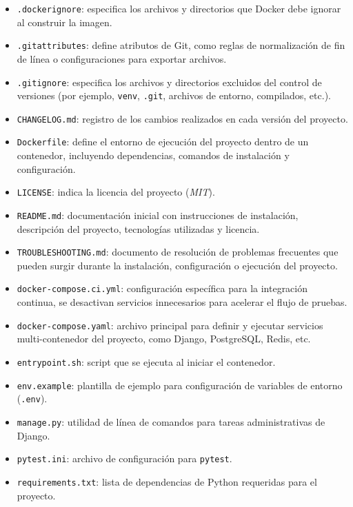 \begin{itemize}
    \item \texttt{.dockerignore}: especifica los archivos y directorios que Docker debe ignorar al construir la imagen.
    \item \texttt{.gitattributes}: define atributos de Git, como reglas de normalización de fin de línea o configuraciones para exportar archivos.
    \item \texttt{.gitignore}: especifica los archivos y directorios excluidos del control de versiones (por ejemplo, \texttt{venv}, \texttt{.git}, archivos de entorno, compilados, etc.).
    \item \texttt{CHANGELOG.md}: registro de los cambios realizados en cada versión del proyecto.
    \item \texttt{Dockerfile}: define el entorno de ejecución del proyecto dentro de un contenedor, incluyendo dependencias, comandos de instalación y configuración.
    \item \texttt{LICENSE}: indica la licencia del proyecto (\textit{MIT}).
    \item \texttt{README.md}: documentación inicial con instrucciones de instalación, descripción del proyecto, tecnologías utilizadas y licencia.
    \item \texttt{TROUBLESHOOTING.md}: documento de resolución de problemas frecuentes que pueden surgir durante la instalación, configuración o ejecución del proyecto.
    \item \texttt{docker-compose.ci.yml}: configuración específica para la integración continua, se desactivan servicios innecesarios para acelerar el flujo de pruebas.
    \item \texttt{docker-compose.yaml}: archivo principal para definir y ejecutar servicios multi-contenedor del proyecto, como Django, PostgreSQL, Redis, etc.
    \item \texttt{entrypoint.sh}: script que se ejecuta al iniciar el contenedor.
    \item \texttt{env.example}: plantilla de ejemplo para configuración de variables de entorno (\texttt{.env}).
    \item \texttt{manage.py}: utilidad de línea de comandos para tareas administrativas de Django.
    \item \texttt{pytest.ini}: archivo de configuración para \texttt{pytest}.
    \item \texttt{requirements.txt}: lista de dependencias de Python requeridas para el proyecto.
\end{itemize}


